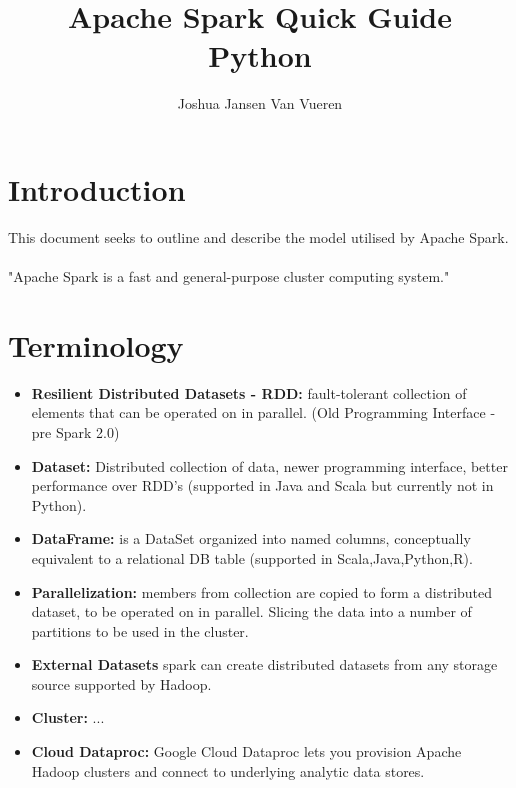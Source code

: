 \documentclass[english]{article}
\begin{document}
\title{Apache Spark Quick Guide \\
Python}


\author{Joshua Jansen Van Vueren}

\maketitle

\section*{Introduction}
This document seeks to outline and describe the model utilised by Apache Spark.
\\\\
"Apache Spark is a fast and general-purpose cluster computing system."

\section{Terminology}
\begin{itemize}
\item \textbf{Resilient Distributed Datasets - RDD: } fault-tolerant collection of elements that can be operated on in parallel. (Old Programming Interface - pre Spark 2.0)
\item \textbf{Dataset: } Distributed collection of data, newer programming interface, better performance over RDD's (supported in Java and Scala but currently not in Python).
\item \textbf{DataFrame: } is a DataSet organized into named columns, conceptually equivalent to a relational DB table (supported in Scala,Java,Python,R).
\item \textbf{Parallelization: } members from collection are copied to form a distributed dataset, to be operated on in parallel. Slicing the data into a number of partitions to be used in the cluster.
\item \textbf{External Datasets} spark can create distributed datasets from any storage source supported by Hadoop.
\item \textbf{Cluster: } ...
\item \textbf{Cloud Dataproc: } Google Cloud Dataproc lets you provision Apache Hadoop clusters and connect to underlying analytic data stores.
\end{itemize}
\end{document}
